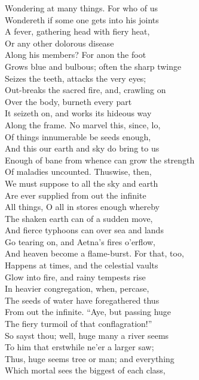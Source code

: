 Wondering at many things. For who of us\\
Wondereth if some one gets into his joints\\
A fever, gathering head with fiery heat,\\
Or any other dolorous disease\\
Along his members? For anon the foot\\
Grows blue and bulbous; often the sharp twinge\\
Seizes the teeth, attacks the very eyes;\\
Out-breaks the sacred fire, and, crawling on\\
Over the body, burneth every part\\
It seizeth on, and works its hideous way\\
Along the frame. No marvel this, since, lo,\\
Of things innumerable be seeds enough,\\
And this our earth and sky do bring to us\\
Enough of bane from whence can grow the strength\\
Of maladies uncounted. Thuswise, then,\\
We must suppose to all the sky and earth\\
Are ever supplied from out the infinite\\
All things, O all in stores enough whereby\\
The shaken earth can of a sudden move,\\
And fierce typhoons can over sea and lands\\
Go tearing on, and Aetna's fires o'erflow,\\
And heaven become a flame-burst. For that, too,\\
Happens at times, and the celestial vaults\\
Glow into fire, and rainy tempests rise\\
In heavier congregation, when, percase,\\
The seeds of water have foregathered thus\\
From out the infinite. ``Aye, but passing huge\\
The fiery turmoil of that conflagration!''\\
So sayst thou; well, huge many a river seems\\
To him that erstwhile ne'er a larger saw;\\
Thus, huge seems tree or man; and everything\\
Which mortal sees the biggest of each class,\\
